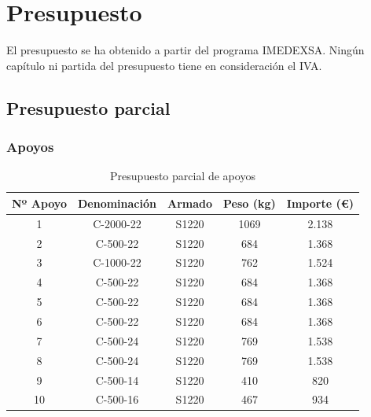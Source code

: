 \chapter{Presupuesto}
\label{ch:presupuesto}
El presupuesto se ha obtenido a partir del programa IMEDEXSA. Ningún capítulo ni partida del presupuesto tiene en consideración el IVA.
\section{Presupuesto parcial}
\label{sec:presupuesto-parcial}
\subsection{Apoyos}
\label{subsec:presupuesto-parcialApoyos}
\begin{table}[H]
\caption{Presupuesto parcial de apoyos}
\centering
\begin{tabular}{|c|c|c|c|c|}
\hline
\rowcolor[HTML]{EFEFEF} 
\textbf{Nº Apoyo} & \textbf{Denominación} & \textbf{Armado} & \textbf{Peso (\si{\kilo\gram})} & \textbf{Importe (€)} \\ \hline
1                 & C-2000-22             & S1220           & 1069               & 2.138                  \\ \hline
2                 & C-500-22              & S1220           & 684                & 1.368                  \\ \hline
3                 & C-1000-22             & S1220           & 762                & 1.524                  \\ \hline
4                 & C-500-22              & S1220           & 684                & 1.368                  \\ \hline
5                 & C-500-22              & S1220           & 684                & 1.368                  \\ \hline
6                 & C-500-22              & S1220           & 684                & 1.368                  \\ \hline
7                 & C-500-24              & S1220           & 769                & 1.538                  \\ \hline
8                 & C-500-24              & S1220           & 769                & 1.538                  \\ \hline
9                 & C-500-14              & S1220           & 410                & 820                    \\ \hline
10                & C-500-16              & S1220           & 467                & 934                    \\ \hline

\end{tabular}
\end{table}
